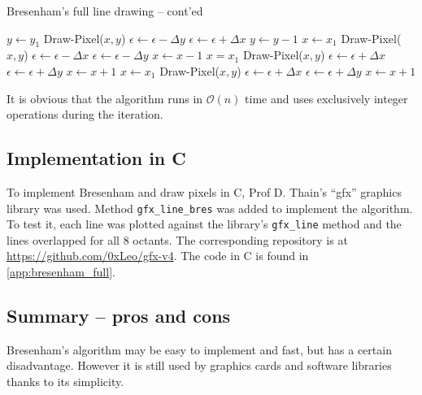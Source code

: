 \documentclass[a4paper]{article}
\begin{document}
\begin{algorithm}[H]
\caption{Bresenham's full line drawing -- cont'ed}
\label{alg:bres_pt2}
\begin{algorithmic}[1]
	\Indent
	\If {$\ldots$} 
	  
		\State $y\leftarrow y_1$
			\State Draw-Pixel($x,y$)
			\State $\epsilon \leftarrow \epsilon - \Delta y$
				\State $\epsilon \leftarrow \epsilon + \Delta x$
				\State $y \leftarrow y - 1$
			\EndIf
		\EndFor
	 
		\State $x\leftarrow x_1$
			\State Draw-Pixel($x,y$)
			\State $\epsilon \leftarrow \epsilon - \Delta x$
				\State $\epsilon \leftarrow \epsilon - \Delta y$
				\State $x \leftarrow x - 1$
			\EndIf
		\EndFor
	 
		\State $x = x_1$
			\State Draw-Pixel($x,y$)
			\State $\epsilon \leftarrow \epsilon + \Delta x$
				\State $\epsilon \leftarrow \epsilon + \Delta y$
				\State $x\leftarrow x+1$
			\EndIf
		\EndFor
	 
		\State $x\leftarrow x_1$
			\State Draw-Pixel($x,y$)
			\State $\epsilon \leftarrow \epsilon + \Delta x$
				\State $\epsilon \leftarrow \epsilon + \Delta y$
				\State $x\leftarrow x+ 1$
			\EndIf
		\EndFor
	 
	\State {}
	\EndIf
	\EndIndent
\end{algorithmic}
\end{algorithm}
It is obvious that the algorithm runs in $\mathcal{O}(n)$ time and uses exclusively integer operations during the iteration.


\subsection{Implementation in C}
To implement Bresenham and draw pixels in C, Prof D. Thain's ``gfx'' graphics library \cite{thain} was used. Method \texttt{gfx\_line\_bres} was added to implement the algorithm. To test it, each line was plotted against the library's \texttt{gfx\_line} method and the lines overlapped for all 8 octants. The corresponding repository is at \url{https://github.com/0xLeo/gfx-v4}. The code in C is found in \ref{app:bresenham_full}.


\subsection{Summary -- pros and cons}
Bresenham's algorithm may be easy to implement and fast, but has a certain disadvantage. However it is still used by graphics cards and software libraries \cite{bhowmick} thanks to its simplicity.
\end{document}
